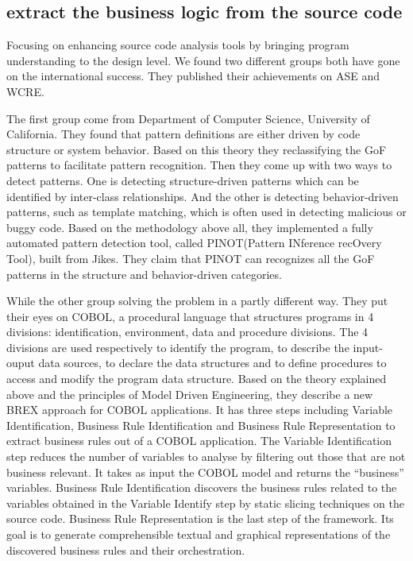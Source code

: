 \documentclass[acmsmall]{acmart}
\begin{document}
\subsection{extract the business logic from the source code}


Focusing on enhancing source code analysis tools by bringing program understanding to the design level. We found two different groups both have gone on the international success. They published their achievements on ASE and WCRE.

The first group come from Department of Computer Science, University of California\cite{2006Reverse}. They found that pattern definitions are either driven by code structure or system behavior. Based on this theory they reclassifying the GoF patterns to facilitate pattern recognition. Then they come up with two ways to detect patterns. One is detecting structure-driven patterns which can be identified by inter-class relationships. And the other is detecting behavior-driven patterns, such as template matching, which is often used in detecting malicious or buggy code. Based on the methodology above all, they implemented a fully automated pattern detection tool, called PINOT(Pattern INference recOvery Tool), built from Jikes. They claim that PINOT can recognizes all the GoF patterns in the structure and behavior-driven categories. 

While the other group solving the problem in a partly different way\cite{2014Extracting}. They put their eyes on COBOL, a procedural language that structures programs in 4 divisions: identification, environment, data and procedure divisions. The 4 divisions are used respectively to identify the program, to describe the input-ouput data sources, to declare the data structures and to define procedures to access and modify the program data structure. Based on the theory explained above and the principles of Model Driven Engineering, they describe a new BREX approach for COBOL applications. It has three steps including Variable Identification, Business Rule Identification and Business Rule Representation to extract business rules out of a COBOL application. The Variable Identification step reduces the number of variables to analyse by filtering out those that are not business relevant. It takes as input the COBOL model and returns the “business” variables. Business Rule Identification discovers the business rules related to the variables obtained in the Variable Identify step by static slicing techniques on the source code. Business Rule Representation is the last step of the framework. Its goal is to generate comprehensible textual and graphical representations of the discovered business rules and their orchestration.
\end{document}
